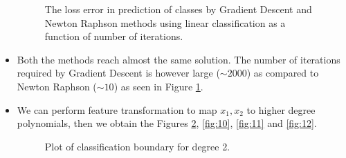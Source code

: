 \documentclass{article}
\begin{document}
\begin{itemize}
\begin{figure}[H]
 \caption{The loss error in prediction of classes by Gradient Descent and Newton Raphson methods using linear classification as a function of number of iterations.}
 \label{fig:8}
 \end{figure}
 
 \item Both the methods reach almost the same solution. The number of iterations required by Gradient Descent is however large ($\sim2000$) as compared to Newton Raphson ($\sim10$) as seen in Figure \ref{fig:8}.
 
 \item We can perform feature transformation to map $x_1, x_2$ to higher degree polynomials, then we obtain the Figures \ref{fig:9}, \ref{fig:10}, \ref{fig:11} and \ref{fig:12}.
 
 \begin{figure}[H]
 \caption{Plot of classification boundary for degree 2.}
 \label{fig:9}
 \end{figure}
 

\end{itemize}
\end{document}

